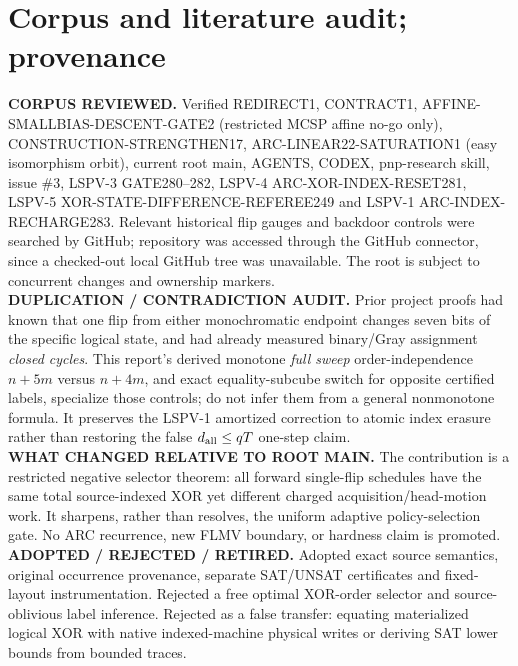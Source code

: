\documentclass[11pt]{article}
\begin{document}
\section{Corpus and literature audit; provenance}
\noindent\textbf{CORPUS REVIEWED.} Verified REDIRECT1, CONTRACT1, AFFINE-SMALLBIAS-DESCENT-GATE2 (restricted MCSP affine no-go only), CONSTRUCTION-STRENGTHEN17, ARC-LINEAR22-SATURATION1 (easy isomorphism orbit), current root main, AGENTS, CODEX, pnp-research skill, issue \#3, LSPV-3 GATE280--282, LSPV-4 ARC-XOR-INDEX-RESET281, LSPV-5 XOR-STATE-DIFFERENCE-REFEREE249 and LSPV-1 ARC-INDEX-RECHARGE283. Relevant historical flip gauges and backdoor controls were searched by GitHub; repository was accessed through the GitHub connector, since a checked-out local GitHub tree was unavailable. The root is subject to concurrent changes and ownership markers.\\
\noindent\textbf{DUPLICATION / CONTRADICTION AUDIT.} Prior project proofs had known that one flip from either monochromatic endpoint changes seven bits of the specific logical state, and had already measured binary/Gray assignment \emph{closed cycles}. This report's derived monotone \emph{full sweep} order-independence $n+5m$ versus $n+4m$, and exact equality-subcube switch for opposite certified labels, specialize those controls; do not infer them from a general nonmonotone formula. It preserves the LSPV-1 amortized correction to atomic index erasure rather than restoring the false $d_{\rm all}\le qT$ one-step claim.\\
\noindent\textbf{WHAT CHANGED RELATIVE TO ROOT MAIN.} The contribution is a restricted negative selector theorem: all forward single-flip schedules have the same total source-indexed XOR yet different charged acquisition/head-motion work. It sharpens, rather than resolves, the uniform adaptive policy-selection gate. No ARC recurrence, new FLMV boundary, or hardness claim is promoted.\\
\noindent\textbf{ADOPTED / REJECTED / RETIRED.} Adopted exact source semantics, original occurrence provenance, separate SAT/UNSAT certificates and fixed-layout instrumentation. Rejected a free optimal XOR-order selector and source-oblivious label inference. Rejected as a false transfer: equating materialized logical XOR with native indexed-machine physical writes or deriving SAT lower bounds from bounded traces.\\
\end{document}
